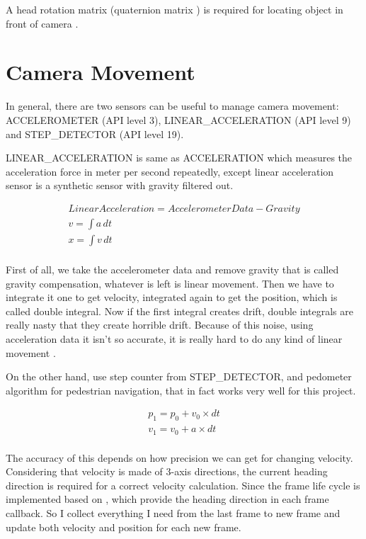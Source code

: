 A head rotation matrix (quaternion matrix \cite{jvv.quaternions.2013}) is required for locating object in front of camera \cite{mathworks.quaternion-rotation.2016}.

\section{Camera Movement}

In general, there are two sensors can be useful to manage camera movement: ACCELEROMETER (API level 3), LINEAR\_ACCELERATION (API level 9) and STEP\_DETECTOR (API level 19). 

LINEAR\_ACCELERATION is same as ACCELERATION which measures the acceleration force in meter per second repeatedly, except linear acceleration sensor is a synthetic sensor with gravity filtered out. 

\[
\begin{array}{lr}
Linear Acceleration = Accelerometer Data - Gravity\\
v = \int a\,dt\\
x = \int v\,dt\\
\end{array}
\]

First of all, we take the accelerometer data and remove gravity that is called gravity compensation, whatever is left is linear movement. Then we have to integrate it one to get velocity, integrated again to get the position, which is called double integral. Now if the first integral creates drift, double integrals are really nasty that they create horrible drift. Because of this noise, using acceleration data it isn't so accurate, it is really hard to do any kind of linear movement \cite{google.sensor-fusion.2010}.

On the other hand, use step counter from STEP\_DETECTOR, and pedometer algorithm for pedestrian navigation, that in fact works very well for this project.

\[
\begin{array}{lr}
p_1 = p_0 + v_0 \times dt\\
v_1 = v_0 + a \times dt\\
\end{array}
\]

The accuracy of this depends on how precision we can get for changing velocity. Considering that velocity is made of 3-axis directions, the current heading direction is required for a correct velocity calculation. Since the frame life cycle is implemented based on \cite{google.vr-sdk.2016}, which provide the heading direction in each frame callback. So I collect everything I need from the last frame to new frame and update both velocity and position for each new frame.

